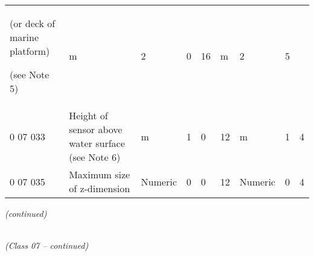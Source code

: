 \begin{longtable}[]{@{}lllllllll@{}}
\begin{minipage}[t]{0.08\columnwidth}
(or deck of marine platform)

(see Note 5)\strut
\end{minipage} & \begin{minipage}[t]{0.08\columnwidth}\raggedright
m\strut
\end{minipage} & \begin{minipage}[t]{0.08\columnwidth}\raggedright
2\strut
\end{minipage} & \begin{minipage}[t]{0.08\columnwidth}\raggedright
0\strut
\end{minipage} & \begin{minipage}[t]{0.08\columnwidth}\raggedright
16\strut
\end{minipage} & \begin{minipage}[t]{0.08\columnwidth}\raggedright
m\strut
\end{minipage} & \begin{minipage}[t]{0.08\columnwidth}\raggedright
2\strut
\end{minipage} & \begin{minipage}[t]{0.08\columnwidth}\raggedright
5\strut
\end{minipage}\tabularnewline
0 07 033 & Height of sensor above water surface (see Note 6) & m & 1 & 0 & 12 & m & 1 & 4\tabularnewline
0 07 035 & Maximum size of z-dimension & Numeric & 0 & 0 & 12 & Numeric & 0 & 4\tabularnewline
\bottomrule
\end{longtable}

\emph{(continued)}

\emph{\\
(Class 07 -- continued)}

